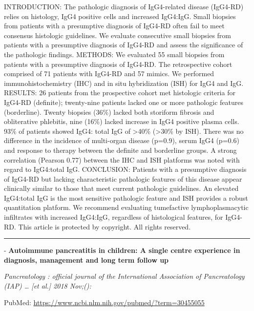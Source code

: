 \documentclass[]{article}
\begin{document}
INTRODUCTION: The pathologic diagnosis of IgG4-related disease (IgG4-RD)
relies on histology, IgG4 positive cells and increased IgG4:IgG. Small
biopsies from patients with a presumptive diagnosis of IgG4-RD often
fail to meet consensus histologic guidelines. We evaluate consecutive
small biopsies from patients with a presumptive diagnosis of IgG4-RD and
assess the significance of the pathologic findings. METHODS: We
evaluated 55 small biopsies from patients with a presumptive diagnosis
of IgG4-RD. The retrospective cohort comprised of 71 patients with
IgG4-RD and 57 mimics. We performed immunohistochemistry (IHC) and in
situ hybridization (ISH) for IgG4 and IgG. RESULTS: 26 patients from the
prospective cohort met histologic criteria for IgG4-RD (definite);
twenty-nine patients lacked one or more pathologic features
(borderline). Twenty biopsies (36\%) lacked both storiform fibrosis and
obliterative phlebitis, nine (16\%) lacked increase in IgG4 positive
plasma cells. 93\% of patients showed IgG4: total IgG of
\textgreater{}40\% (\textgreater{}30\% by ISH). There was no difference
in the incidence of multi-organ disease (p=0.9), serum IgG4 (p=0.6) and
response to therapy between the definite and borderline groups. A strong
correlation (Pearson 0.77) between the IHC and ISH platforms was noted
with regard to IgG4:total IgG. CONCLUSION: Patients with a presumptive
diagnosis of IgG4-RD but lacking characteristic pathologic features of
this disease appear clinically similar to those that meet current
pathologic guidelines. An elevated IgG4:total IgG is the most sensitive
pathologic feature and ISH provides a robust quantitation platform. We
recommend evaluating tumefactive lymphoplasmacytic infiltrates with
increased IgG4:IgG, regardless of histological features, for IgG4-RD.
This article is protected by copyright. All rights reserved.

{}

{}

\begin{center}\rule{0.5\linewidth}{\linethickness}\end{center}

 - \textbf{Autoimmune pancreatitis in children: A single centre
experience in diagnosis, management and long term follow up}

\emph{Pancreatology : official journal of the International Association
of Pancreatology (IAP) \ldots{} {[}et al.{]} 2018 Nov;():}

PubMed: \url{https://www.ncbi.nlm.nih.gov/pubmed/?term=30455055}
\end{document}
